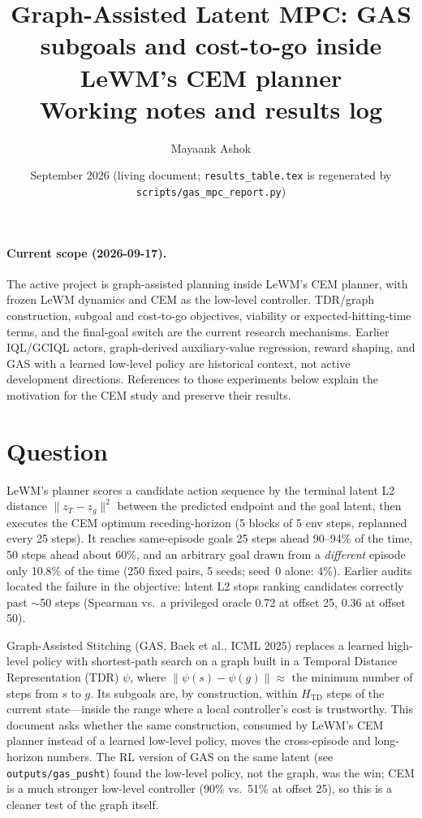 \documentclass[11pt]{article}
\title{Graph-Assisted Latent MPC: GAS subgoals and cost-to-go inside LeWM's CEM planner\\
\large Working notes and results log}
\author{Mayaank Ashok}
\date{September 2026 (living document; \texttt{results\_table.tex} is regenerated by \texttt{scripts/gas\_mpc\_report.py})}
\newcommand{\z}{z}
\newcommand{\psiT}{\psi}
\newcommand{\Htd}{H_{\mathrm{TD}}}
\begin{document}
\maketitle

\paragraph{Current scope (2026-09-17).} The active project is graph-assisted planning
inside LeWM's CEM planner, with frozen LeWM dynamics and CEM as the low-level controller.
TDR/graph construction, subgoal and cost-to-go objectives, viability or expected-hitting-time
terms, and the final-goal switch are the current research mechanisms. Earlier IQL/GCIQL
actors, graph-derived auxiliary-value regression, reward shaping, and GAS with a learned
low-level policy are historical context, not active development directions. References to
those experiments below explain the motivation for the CEM study and preserve their results.

\section{Question}
LeWM's planner scores a candidate action sequence by the terminal latent L2 distance
$\|\z_T - \z_g\|^2$ between the predicted endpoint and the goal latent, then executes the
CEM optimum receding-horizon (5 blocks of 5 env steps, replanned every 25 steps). It reaches
same-episode goals 25 steps ahead 90--94\% of the time, 50 steps ahead about 60\%, and an
arbitrary goal drawn from a \emph{different} episode only 10.8\% of the time (250 fixed pairs,
5 seeds; seed~0 alone: 4\%). Earlier audits located the failure in the objective: latent L2
stops ranking candidates correctly past $\sim$50 steps (Spearman vs.\ a privileged oracle
0.72 at offset 25, 0.36 at offset 50).

Graph-Assisted Stitching (GAS, Baek et al., ICML 2025) replaces a learned high-level policy
with shortest-path search on a graph built in a Temporal Distance Representation (TDR)
$\psiT$, where $\|\psiT(s)-\psiT(g)\|\approx$ the minimum number of steps from $s$ to $g$.
Its subgoals are, by construction, within $\Htd$ steps of the current state---inside the
range where a local controller's cost is trustworthy. This document asks whether the
same construction, consumed by LeWM's CEM planner instead of a learned low-level policy,
moves the cross-episode and long-horizon numbers. The RL version of GAS on the same latent
(see \texttt{outputs/gas\_pusht}) found the low-level policy, not the graph, was the win;
CEM is a much stronger low-level controller (90\% vs.\ 51\% at offset 25), so this is a
cleaner test of the graph itself.
\end{document}
